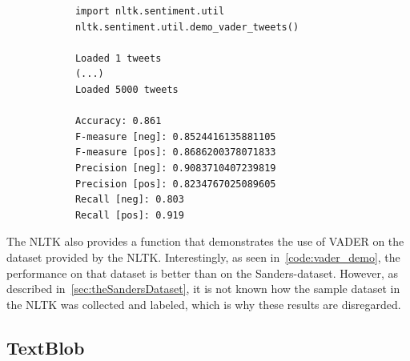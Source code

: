 \begin{table}[t]
    \begin{minipage}[t]{.4\textwidth }
        \caption{F-measure, precision and recall of VADER}
        \label{tab:vader_results}
        \vspace{1.5mm} %
    \end{minipage}%
    \hfill
    \begin{minipage}[t]{.55\textwidth}
        \label{code:vader_demo}
        \begin{verbatim}
            import nltk.sentiment.util
            nltk.sentiment.util.demo_vader_tweets()

            Loaded 1 tweets
            (...)
            Loaded 5000 tweets

            Accuracy: 0.861
            F-measure [neg]: 0.8524416135881105
            F-measure [pos]: 0.8686200378071833
            Precision [neg]: 0.9083710407239819
            Precision [pos]: 0.8234767025089605
            Recall [neg]: 0.803
            Recall [pos]: 0.919
        \end{verbatim}
    \end{minipage}
\end{table}

The NLTK also provides a function that demonstrates the use of VADER on the dataset provided by the NLTK.
Interestingly, as seen in~\cref{code:vader_demo}, the performance on that dataset is better than on the Sanders-dataset.
However, as described in~\cref{sec:theSandersDataset}, it is not known how the sample dataset in the NLTK was collected and labeled,
which is why these results are disregarded.

\subsection{TextBlob}
\label{subsec:textblob}

